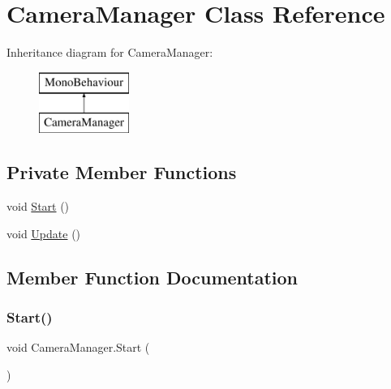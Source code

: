 \hypertarget{class_camera_manager}{}\section{Camera\+Manager Class Reference}
\label{class_camera_manager}
Inheritance diagram for Camera\+Manager\+:\begin{figure}[H]
\begin{center}
\leavevmode
\includegraphics[height=2.000000cm]{class_camera_manager}
\end{center}
\end{figure}
\subsection*{Private Member Functions}
\begin{DoxyCompactItemize}
\item 
void \hyperlink{class_camera_manager_a5010f55d95e2b09bf041387388a38ec1}{Start} ()
\item 
void \hyperlink{class_camera_manager_a10cfc1f1e06a1ebd569c60b48261a692}{Update} ()
\end{DoxyCompactItemize}


\subsection{Member Function Documentation}
\mbox{\label{class_camera_manager_a5010f55d95e2b09bf041387388a38ec1}} 
\subsubsection{\texorpdfstring{Start()}{Start()}}
{\footnotesize\ttfamily void Camera\+Manager.\+Start (\begin{DoxyParamCaption}{ }\end{DoxyParamCaption})\hspace{0.3cm}{\ttfamily [private]}}

\mbox{\label{class_camera_manager_a10cfc1f1e06a1ebd569c60b48261a692}} 
